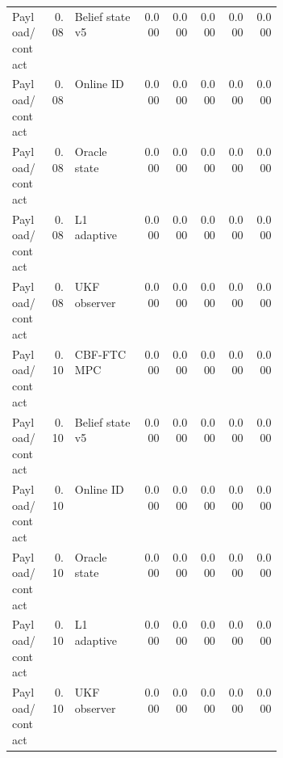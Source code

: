 \documentclass{article}
\begin{document}
\begin{center}
\begin{longtable}{p{0.14\linewidth}rp{0.25\linewidth}rrrrr}
Payload/contact & 0.08 & Belief state v5 & 0.000 & 0.000 & 0.000 & 0.000 & 0.000\\
Payload/contact & 0.08 & Online ID & 0.000 & 0.000 & 0.000 & 0.000 & 0.000\\
Payload/contact & 0.08 & Oracle state & 0.000 & 0.000 & 0.000 & 0.000 & 0.000\\
Payload/contact & 0.08 & L1 adaptive & 0.000 & 0.000 & 0.000 & 0.000 & 0.000\\
Payload/contact & 0.08 & UKF observer & 0.000 & 0.000 & 0.000 & 0.000 & 0.000\\
Payload/contact & 0.10 & CBF-FTC MPC & 0.000 & 0.000 & 0.000 & 0.000 & 0.000\\
Payload/contact & 0.10 & Belief state v5 & 0.000 & 0.000 & 0.000 & 0.000 & 0.000\\
Payload/contact & 0.10 & Online ID & 0.000 & 0.000 & 0.000 & 0.000 & 0.000\\
Payload/contact & 0.10 & Oracle state & 0.000 & 0.000 & 0.000 & 0.000 & 0.000\\
Payload/contact & 0.10 & L1 adaptive & 0.000 & 0.000 & 0.000 & 0.000 & 0.000\\
Payload/contact & 0.10 & UKF observer & 0.000 & 0.000 & 0.000 & 0.000 & 0.000\\
\bottomrule
\end{longtable}
\normalsize
\end{center}
\end{document}
